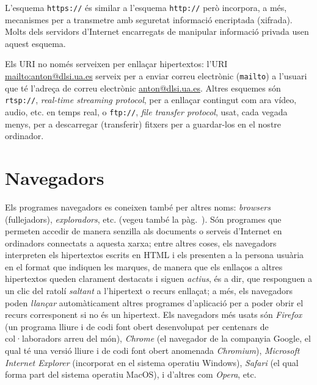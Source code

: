 L'esquema {\tt https://} és similar a l'esquema {\tt http://} però
incorpora, a més, mecanismes per a transmetre amb seguretat informació
encriptada (xifrada). Molts dels servidors d'Internet encarregats de
manipular informació privada usen aquest esquema.

Els URI no només serveixen per enllaçar hipertextos: l'URI
\url{mailto:anton@dlsi.ua.es} serveix per a enviar correu electrònic
({\tt mailto}) a l'usuari que té l'adreça de correu electrònic
\url{anton@dlsi.ua.es}. Altres esquemes són \texttt{rtsp://},
\emph{real-time streaming protocol}, per a enllaçar contingut com ara
vídeo, audio, etc. en temps real, o {\tt ftp://}, \emph{file transfer
  protocol}, usat, cada vegada menys, per a descarregar (transferir)
fitxers per a guardar-los en el nostre ordinador\label{pg:ftp}.

\section{Navegadors}
\label{ss:navegadors}
Els programes navegadors es coneixen també per altres noms: {\em
  browsers} (fullejadors), \emph{exploradors}, etc. (vegeu també la
pàg.~\pageref{pg:navegadors}).  Són programes que permeten accedir de
manera senzilla als documents o serveis d'Internet en ordinadors
connectats a aquesta xarxa; entre altres coses, els navegadors
interpreten els hipertextos escrits en HTML i els presenten a la
persona usuària en el format que indiquen les marques, de manera que
els enllaços a altres hipertextos queden clarament destacats i siguen
\emph{actius}, és a dir, que responguen a un clic del ratolí
\emph{saltant} a l'hipertext o recurs enllaçat; a més, els navegadors
poden \emph{llançar} automàticament altres programes d'aplicació per a
poder obrir el recurs corresponent si no és un hipertext. Els
navegadors més usats són \emph{Firefox} (un programa lliure i de codi
font obert desenvolupat per centenars de col·laboradors arreu del
món), \emph{Chrome} (el navegador de la companyia Google, el qual té
una versió lliure i de codi font obert anomenada \emph{Chromium}),
\emph{Microsoft Internet Explorer} (incorporat en el sistema operatiu
Windows), \emph{Safari} (el qual forma part del sistema operatiu
MacOS), i d'altres com \emph{Opera}, etc.
 

